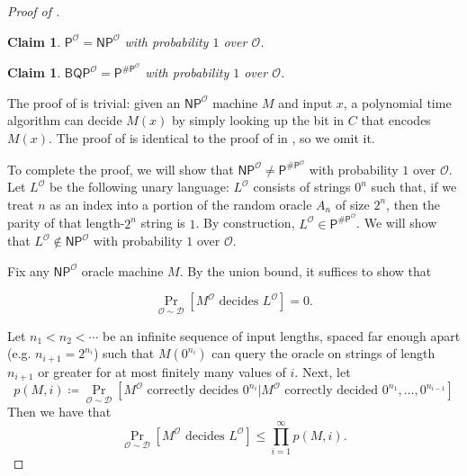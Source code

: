 \documentclass[11pt]{article}%
\newtheorem{claim}[theorem]{Claim}
\begin{document}
\begin{proof}[Proof of ]
\begin{claim}
\label{claim:p=np}
$\mathsf{P}^\mathcal{O} = \mathsf{NP}^\mathcal{O}$ with probability $1$ over $\mathcal{O}$.
\end{claim}

\begin{claim}
\label{claim:bqp=pp}
$\mathsf{BQP}^\mathcal{O} = \mathsf{P}^{\mathsf{\# P}^\mathcal{O}}$ with probability $1$ over $\mathcal{O}$.
\end{claim}

The proof of  is trivial: given an $\mathsf{NP}^\mathcal{O}$ machine $M$ and input $x$, a polynomial time algorithm can decide $M(x)$ by simply looking up the bit in $C$ that encodes $M(x)$. The proof of  is identical to the proof of  in , so we omit it.

To complete the proof, we will show that $\mathsf{NP}^\mathcal{O} \neq \mathsf{P}^{\mathsf{\# P}^\mathcal{O}}$ with probability $1$ over $\mathcal{O}$. Let $L^\mathcal{O}$ be the following unary language: $L^\mathcal{O}$ consists of strings $0^n$ such that, if we treat $n$ as an index into a portion of the random oracle $A_n$ of size $2^n$, then the parity of that length-$2^n$ string is $1$. By construction, $L^\mathcal{O} \in \mathsf{P}^{\mathsf{\# P}^\mathcal{O}}$. We will show that $L^\mathcal{O} \not\in \mathsf{NP}^\mathcal{O}$ with probability $1$ over $\mathcal{O}$.

Fix any $\mathsf{NP}^{\mathcal{O}}$ oracle machine $M$. By the union bound, it suffices to show that

\[
\Pr_{\mathcal{O}\sim\mathcal{D}}\left[M^\mathcal{O} \text{ decides } L^\mathcal{O}\right]=0.
\]

Let $n_1<n_2<\cdots$ be an infinite sequence of input lengths, spaced far enough apart (e.g. $n_{i+1}=2^{n_i}$) such that $M\left(0^{n_i}\right)$ can query the oracle on strings of length $n_{i+1}$ or greater for at most finitely many values of $i$. Next, let
\[
p(M,i)\coloneqq\Pr_{\mathcal{O}\sim\mathcal{D}}\left[M^\mathcal{O} \text{ correctly decides } 0^{n_i}|M^\mathcal{O} \text{ correctly decided }0^{n_1},\dots,0^{n_{i-1}}\right]
\]
Then we have that
\[
\Pr_{\mathcal{O}\sim\mathcal{D}}\left[M^\mathcal{O}\text{ decides }L^\mathcal{O}\right]\leq\prod_{i=1}^\infty p(M,i).
\]


\end{proof}
\end{document}
